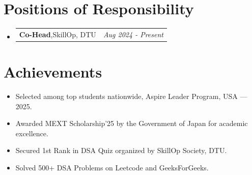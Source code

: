 \documentclass[a4paper,10pt]{article}
\makeatletter
\newcommand{\resumePOR}[3]{
\vspace{0.5mm}\item
    \begin{tabular*}{0.97\textwidth}[t]{l@{\extracolsep{\fill}}r}
        \textbf{#1},\hspace{0.3mm}#2 & \textit{\small{#3}} 
    \end{tabular*}
    \vspace{-2mm}
}
\newcommand{\resumeSubheading}[4]{
\vspace{0.5mm}\item
    \begin{tabular*}{0.98\textwidth}[t]{l@{\extracolsep{\fill}}r}
        \textbf{#1} & \textit{\footnotesize{#4}} \\
        \textit{\footnotesize{#3}} &  \footnotesize{#2}\\
    \end{tabular*}
    \vspace{-2.4mm}
}
\newcommand{\resumeSubHeadingListStart}{\begin{itemize}[leftmargin=*,labelsep=0mm]}
\newcommand{\resumeItemListStart}{\begin{justify}\begin{itemize}[leftmargin=3ex, rightmargin=2ex, noitemsep,labelsep=1.2mm,itemsep=0mm]\small}
\newcommand{\resumeSubHeadingListEnd}{\end{itemize}\vspace{2mm}}
\newcommand{\resumeItemListEnd}{\end{itemize}\end{justify}\vspace{-2mm}}
\makeatother
\begin{document}

\section{\textbf{Positions of Responsibility}}
\vspace{-0.4mm}
\resumeSubHeadingListStart

\resumePOR
{Co-Head}
{SkillOp, DTU}
{Aug 2024 - Present}

\resumeSubHeadingListEnd
\vspace{-4mm}

\section{\textbf{Achievements}}
\vspace{-0.1mm}
\resumeItemListStart
\item Selected among top students nationwide, Aspire Leader Program, USA — 2025.
\item Awarded MEXT Scholarship’25 by the Government of Japan for academic excellence.
\item Secured 1st Rank in DSA Quiz organized by SkillOp Society, DTU.
\item Solved 500+ DSA Problems on Leetcode and GeeksForGeeks.
\resumeItemListEnd

\end{document}
